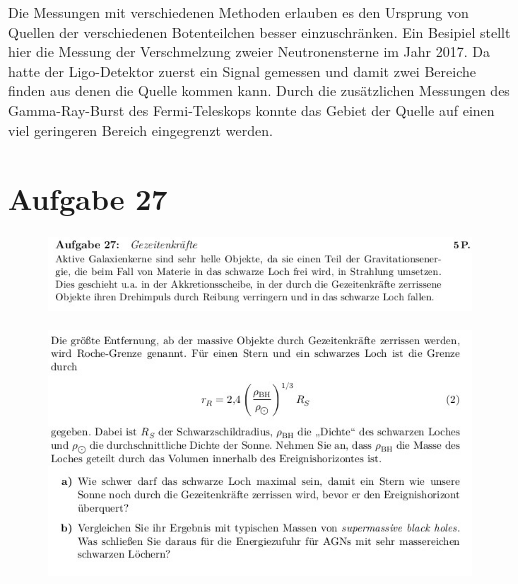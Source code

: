 Die Messungen mit verschiedenen Methoden erlauben es den Ursprung von Quellen
der verschiedenen Botenteilchen besser einzuschränken. Ein Besipiel stellt
hier die Messung der Verschmelzung zweier Neutronensterne im Jahr 2017.
Da hatte der Ligo-Detektor zuerst ein Signal gemessen und damit zwei Bereiche
finden aus denen die Quelle kommen kann. Durch die zusätzlichen Messungen des 
Gamma-Ray-Burst des Fermi-Teleskops konnte das Gebiet der Quelle auf einen
viel geringeren Bereich eingegrenzt werden.






\section{Aufgabe 27}
\begin{figure}[H]
    \centering
    \includegraphics[width=\textwidth]{images/ex27_1.jpg}
\end{figure}
\begin{figure}[H]
    \centering
    \includegraphics[width=\textwidth]{images/ex27_2.jpg}
\end{figure}



